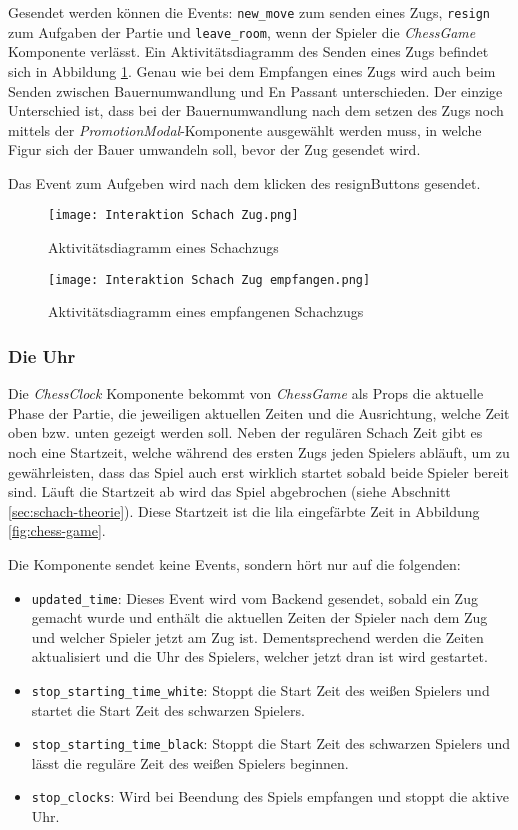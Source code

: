 Gesendet werden können die Events: \verb|new_move| zum senden eines Zugs, \verb|resign| zum Aufgaben der Partie und \verb|leave_room|, wenn der Spieler die \textit{ChessGame} Komponente verlässt.
Ein Aktivitätsdiagramm des Senden eines Zugs befindet sich in Abbildung \ref{fig:chess-move}. Genau wie bei dem Empfangen eines Zugs wird auch beim Senden zwischen Bauernumwandlung und En Passant unterschieden. Der einzige Unterschied ist, dass bei der Bauernumwandlung nach dem setzen des Zugs noch mittels der  \textit{PromotionModal}-Komponente ausgewählt werden muss, in welche Figur sich der Bauer umwandeln soll, bevor der Zug gesendet wird.

Das Event zum Aufgeben wird nach dem klicken des \glqq resign\grqq{ }Buttons gesendet.


      \begin{figure}[h]
      \centering
  \texttt{[image: Interaktion Schach Zug.png]}
  \caption{Aktivitätsdiagramm eines Schachzugs}
  \label{fig:chess-move}
\end{figure}

      \begin{figure}[h]
      \centering
  \texttt{[image: Interaktion Schach Zug empfangen.png]}
  \caption{Aktivitätsdiagramm eines empfangenen Schachzugs}
  \label{fig:chess-opponent-move}
\end{figure}

        \subsubsection{Die Uhr}
Die \textit{ChessClock} Komponente bekommt von \textit{ChessGame} als Props die aktuelle Phase der Partie, die jeweiligen aktuellen Zeiten und die Ausrichtung, welche Zeit oben bzw. unten gezeigt werden soll. Neben der regulären Schach Zeit gibt es noch eine Startzeit, welche während des ersten Zugs jeden Spielers abläuft, um zu gewährleisten, dass das Spiel auch erst wirklich startet sobald beide Spieler bereit sind. Läuft die Startzeit ab wird das Spiel abgebrochen (siehe Abschnitt \ref{sec:schach-theorie}). Diese Startzeit ist die lila eingefärbte Zeit in Abbildung \ref{fig:chess-game}.

Die Komponente sendet keine Events, sondern hört nur auf die folgenden:
\begin{itemize}
\item \verb|updated_time|: Dieses Event wird vom Backend gesendet, sobald ein Zug gemacht wurde und enthält die aktuellen Zeiten der Spieler nach dem Zug und welcher Spieler jetzt am Zug ist. Dementsprechend werden die Zeiten aktualisiert und die Uhr des Spielers, welcher jetzt dran ist wird gestartet.
\item \verb|stop_starting_time_white|: Stoppt die Start Zeit des weißen Spielers und startet die Start Zeit des schwarzen Spielers.
\item \verb|stop_starting_time_black|: Stoppt die Start Zeit des schwarzen Spielers und lässt die reguläre Zeit des weißen Spielers beginnen.
\item \verb|stop_clocks|: Wird bei Beendung des Spiels empfangen und stoppt die aktive Uhr.
\end{itemize}

